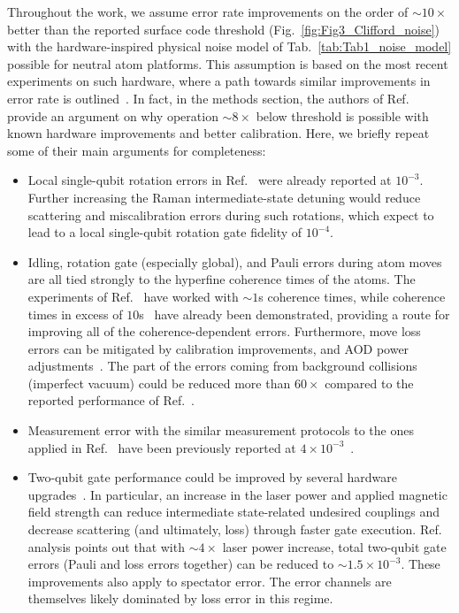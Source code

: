 \documentclass[aps, prx, reprint, superscriptaddress, longbibliography, floatfix]{revtex4-2}
\begin{document}
Throughout the work, we assume error rate improvements on the order of $\sim 10 \times$ better than the reported surface code threshold (Fig.~\ref{fig:Fig3_Clifford_noise}) with the hardware-inspired physical noise model of Tab.~\ref{tab:Tab1_noise_model} possible for neutral atom platforms. This assumption is based on the most recent experiments on such hardware, where a path towards similar improvements in error rate is outlined~\cite{Bluvstein2025b}. In fact, in the methods section, the authors of Ref.~\cite{Bluvstein2025b} provide an argument on why operation $\sim 8 \times$ below threshold is possible with known hardware improvements and better calibration. Here, we briefly repeat some of their main arguments for completeness:
\begin{itemize}
    \item Local single-qubit rotation errors in Ref.~\cite{Bluvstein2025b} were already reported at $10^{-3}$. Further increasing the Raman intermediate-state detuning would reduce scattering and miscalibration errors during such rotations, which expect to lead to a local single-qubit rotation gate fidelity of $10^{-4}$.
    \item Idling, rotation gate (especially global), and Pauli errors during atom moves are all tied strongly to the hyperfine coherence times of the atoms. The experiments of Ref.~\cite{Bluvstein2025b} have worked with $\sim 1$s coherence times, while coherence times in excess of $10$s~\cite{Manetsch2025} have already been demonstrated, providing a route for improving all of the coherence-dependent errors. Furthermore, move loss errors can be mitigated by calibration improvements, and AOD power adjustments~\cite{Bluvstein2025b}. The part of the errors coming from background collisions (imperfect vacuum) could be reduced more than $60 \times$ compared to the reported performance of Ref.~\cite{Bluvstein2025b}.
    \item Measurement error with the similar measurement protocols to the ones applied in Ref.~\cite{Bluvstein2025b} have been previously reported at $4 \times 10^{-3}$~\cite{Gross2019}.
    \item Two-qubit gate performance could be improved by several hardware upgrades~\cite{Bluvstein2025b}. In particular, an increase in the laser power and applied magnetic field strength can reduce intermediate state-related undesired couplings and decrease scattering (and ultimately, loss) through faster gate execution. Ref.~\cite{Bluvstein2025b} analysis points out that with $\sim 4 \times$ laser power increase, total two-qubit gate errors (Pauli and loss errors together) can be reduced to $ \sim 1.5\times 10^{-3}$. These improvements also apply to spectator error. The error channels are themselves likely dominated by loss error in this regime.
\end{itemize}
\end{document}
